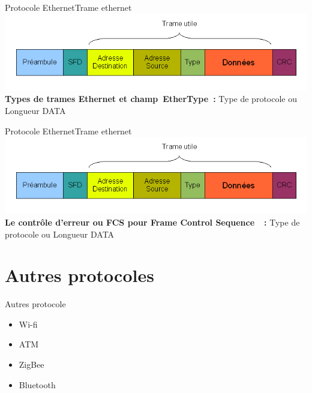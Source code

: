 \documentclass{beamer}
\begin{document}
	\begin{frame}{Protocole Ethernet}{Trame ethernet}
		\includegraphics[scale=0.7]{trame.png}
		\textbf{Types de trames Ethernet et champ EtherType :} Type de protocole ou Longueur DATA 
	\end{frame}

	\begin{frame}{Protocole Ethernet}{Trame ethernet}
		\includegraphics[scale=0.7]{trame.png}
		\textbf{Le contrôle d’erreur ou FCS pour Frame Control Sequence  :} Type de protocole ou Longueur DATA 
	\end{frame}

\section{Autres protocoles}

	\begin{frame}{Autres protocole}
		\begin{itemize}
			\item [\textbullet] Wi-fi
			\item [\textbullet] ATM
			\item [\textbullet] ZigBee
			\item [\textbullet] Bluetooth
		\end{itemize} 
	\end{frame}
\end{document}
